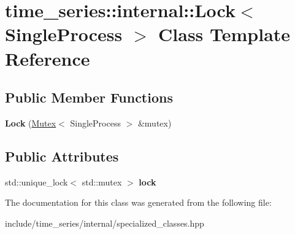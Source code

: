 \hypertarget{classtime__series_1_1internal_1_1Lock_3_01SingleProcess_01_4}{}\section{time\+\_\+series\+:\+:internal\+:\+:Lock$<$ Single\+Process $>$ Class Template Reference}
\label{classtime__series_1_1internal_1_1Lock_3_01SingleProcess_01_4}
\subsection*{Public Member Functions}
\begin{DoxyCompactItemize}
\item 
\mbox{\label{classtime__series_1_1internal_1_1Lock_3_01SingleProcess_01_4_a72f9c7a4ed7e234e29944a88998dd33c}} 
{\bfseries Lock} (\hyperlink{classtime__series_1_1internal_1_1Mutex}{Mutex}$<$ Single\+Process $>$ \&mutex)
\end{DoxyCompactItemize}
\subsection*{Public Attributes}
\begin{DoxyCompactItemize}
\item 
\mbox{\label{classtime__series_1_1internal_1_1Lock_3_01SingleProcess_01_4_a68c4eb7f7a836b37f4296e09b498edbe}} 
std\+::unique\+\_\+lock$<$ std\+::mutex $>$ {\bfseries lock}
\end{DoxyCompactItemize}


The documentation for this class was generated from the following file\+:\begin{DoxyCompactItemize}
\item 
include/time\+\_\+series/internal/specialized\+\_\+classes.\+hpp\end{DoxyCompactItemize}
